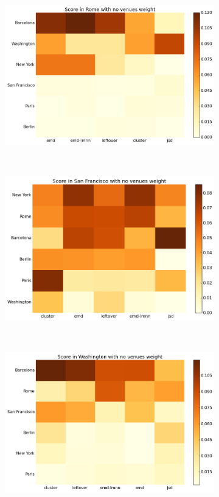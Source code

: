 \documentclass[svgnames,a4paper,final,notitlepage,10pt]{article}
\begin{document}
\begin{figure}[h]
    \begin{subfigure}[b]{0.3\textwidth}
        \centering
	\includegraphics[width=\linewidth]{metrics_from_rome.png}
    \end{subfigure}~
    \begin{subfigure}[b]{0.3\textwidth}
        \centering
	\includegraphics[width=\linewidth]{metrics_from_sanfrancisco.png}
    \end{subfigure}~
    \begin{subfigure}[b]{0.3\textwidth}
        \centering
	\includegraphics[width=\linewidth]{metrics_from_washington.png}
    \end{subfigure}
\end{figure}
\clearpage
\end{document}
